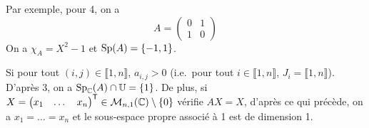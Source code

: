 \documentclass[12pt]{article}
\begin{document}
\begin{remark}
	Par exemple, pour 4, on a 
	\begin{equation}
		A=
		\begin{pmatrix}
			0&1\\
			1&0
		\end{pmatrix}
	\end{equation}
	On a $\chi_{A}=X^{2}-1$ et $\operatorname{Sp}(A)=\lbrace-1,1\rbrace$.
\end{remark}

\begin{remark}
	Si pour tout $(i,j)\in\llbracket1,n\rrbracket$, $a_{i,j}>0$ (i.e.~pour tout $i\in\llbracket1,n\rrbracket$, $J_{i}=\llbracket1,n\rrbracket$). D'après 3, on a $\operatorname{Sp}_{\mathbb{C}}(A)\cap\mathbb{U}=\lbrace1\rbrace$. De plus, si $X=\begin{pmatrix}
		x_{1}&\dots&x_{n}
	\end{pmatrix}^{\mathsf{T}}\in\mathcal{M}_{n,1}(\mathbb{C})\setminus\lbrace0\rbrace$ vérifie $AX=X$, d'après ce qui précède, on a $x_{1}=\dots=x_{n}$ et le sous-espace propre associé à 1 est de dimension 1.
\end{remark}
\end{document}
